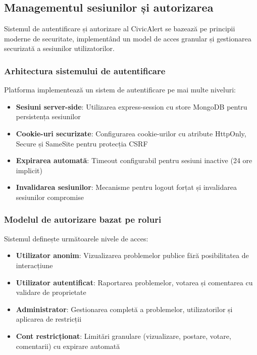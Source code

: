 \documentclass[12pt,a4paper]{report}
\begin{document}
\subsection{Managementul sesiunilor și autorizarea}

Sistemul de autentificare și autorizare al CivicAlert se bazează pe principii moderne de securitate, implementând un model de acces granular și gestionarea securizată a sesiunilor utilizatorilor.

\subsubsection{Arhitectura sistemului de autentificare}

Platforma implementează un sistem de autentificare pe mai multe niveluri:

\begin{itemize}
    \item \textbf{Sesiuni server-side}: Utilizarea express-session cu store MongoDB pentru persistența sesiunilor
    \item \textbf{Cookie-uri securizate}: Configurarea cookie-urilor cu atribute HttpOnly, Secure și SameSite pentru protecția CSRF
    \item \textbf{Expirarea automată}: Timeout configurabil pentru sesiuni inactive (24 ore implicit)
    \item \textbf{Invalidarea sesiunilor}: Mecanisme pentru logout forțat și invalidarea sesiunilor compromise
\end{itemize}

\subsubsection{Modelul de autorizare bazat pe roluri}

Sistemul definește următoarele nivele de acces:

\begin{itemize}
    \item \textbf{Utilizator anonim}: Vizualizarea problemelor publice fără posibilitatea de interacțiune
    \item \textbf{Utilizator autentificat}: Raportarea problemelor, votarea și comentarea cu validare de proprietate
    \item \textbf{Administrator}: Gestionarea completă a problemelor, utilizatorilor și aplicarea de restricții
    \item \textbf{Cont restricționat}: Limitări granulare (vizualizare, postare, votare, comentarii) cu expirare automată
\end{itemize}
\end{document}
